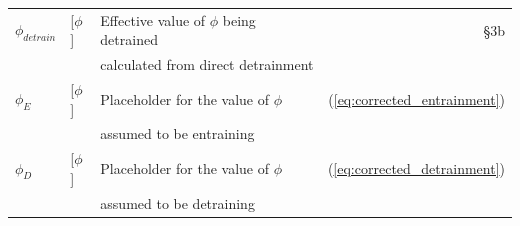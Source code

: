 \documentclass[12pt]{article}
\begin{document}
\begin{appendix}
\begin{table}[t]
\begin{center}
\begin{tabular}{lllr}
 $\phi_{detrain}$ 
    & [$\phi$]            
    & Effective value of $\phi$ being detrained
    & \S 3b \\
   && calculated from direct detrainment & \\

 $\phi_E$         
    & [$\phi$]            
    & Placeholder for the value of $\phi$ 
    & (\ref{eq:corrected_entrainment}) \\
   && assumed to be entraining & \\

 $\phi_D$         
    & [$\phi$]            
    & Placeholder for the value of $\phi$ 
    & (\ref{eq:corrected_detrainment}) \\
   && assumed to be detraining & \\
\hline
\end{tabular}
\end{center}
\end{table}

\end{appendix}



{}
{\clearpage}



\end{document}
